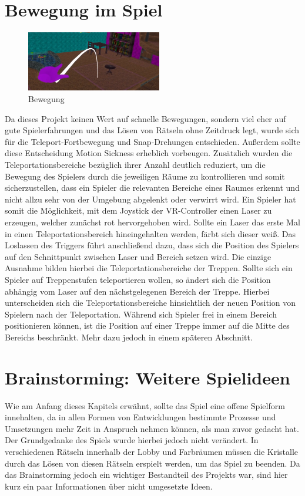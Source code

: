 \section{Bewegung im Spiel}
\begin{figure}
	\vspace*{-0.5cm}
	\includegraphics[width=5.9cm]{Pictures/Bewegung}
	\caption{Bewegung}
	\vspace*{0cm}
	\label{fig:bewegung}
\end{figure}
Da dieses Projekt keinen Wert auf schnelle Bewegungen, sondern viel eher auf gute Spielerfahrungen und das Lösen von Rätseln ohne Zeitdruck legt, wurde sich für die Teleport-Fortbewegung und Snap-Drehungen entschieden. Außerdem sollte diese Entscheidung Motion Sickness erheblich vorbeugen. Zusätzlich wurden die Teleportationsbereiche bezüglich ihrer Anzahl deutlich reduziert, um die Bewegung des Spielers durch die jeweiligen Räume zu kontrollieren und somit sicherzustellen, dass ein Spieler die relevanten Bereiche eines Raumes erkennt und nicht allzu sehr von der Umgebung abgelenkt oder verwirrt wird. Ein Spieler hat somit die Möglichkeit, mit dem Joystick der VR-Controller einen Laser zu erzeugen, welcher zunächst rot hervorgehoben wird. Sollte ein Laser das erste Mal in einen Teleportationsbereich hineingehalten werden, färbt sich dieser weiß. Das Loslassen des Triggers führt anschließend dazu, dass sich die Position des Spielers auf den Schnittpunkt zwischen Laser und Bereich setzen wird. Die einzige Ausnahme bilden hierbei die Teleportationsbereiche der Treppen. Sollte sich ein Spieler auf Treppenstufen teleportieren wollen, so ändert sich die Position abhängig vom Laser auf den nächstgelegenen Bereich der Treppe. Hierbei unterscheiden sich die Teleportationsbereiche hinsichtlich der neuen Position von Spielern nach der Teleportation. Während sich Spieler frei in einem Bereich positionieren können, ist die Position auf einer Treppe immer auf die Mitte des Bereichs beschränkt. Mehr dazu jedoch in einem späteren Abschnitt.

\section{Brainstorming: Weitere Spielideen}
Wie am Anfang dieses Kapitels erwähnt, sollte das Spiel eine offene Spielform innehalten, da in allen Formen von Entwicklungen bestimmte Prozesse und Umsetzungen mehr Zeit in Anspruch nehmen können, als man zuvor gedacht hat. Der Grundgedanke des Spiels wurde hierbei jedoch nicht verändert. In verschiedenen Rätseln innerhalb der Lobby und Farbräumen müssen die Kristalle durch das Lösen von diesen Rätseln erspielt werden, um das Spiel zu beenden. Da das Brainstorming jedoch ein wichtiger Bestandteil des Projekts war, sind hier kurz ein paar Informationen über nicht umgesetzte Ideen.
